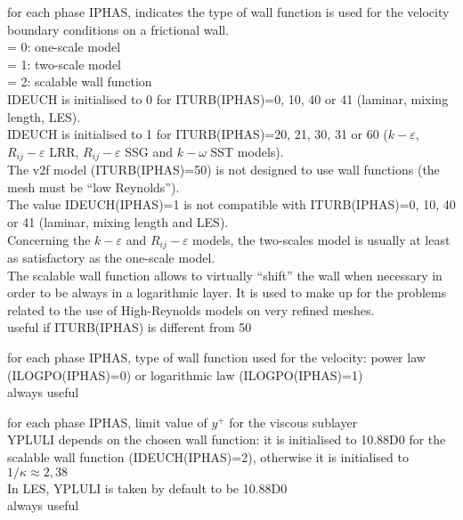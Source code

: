{for each phase IPHAS, indicates the type of wall function is used for the velocity
boundary conditions on a frictional wall.\\
\hspace*{1.3cm}= 0: one-scale model\\
\hspace*{1.3cm}= 1: two-scale model\\
\hspace*{1.3cm}= 2: scalable wall function\\
IDEUCH is initialised to 0 for ITURB(IPHAS)=0, 10, 40 or 41 (laminar,
mixing length, LES).\\
IDEUCH is initialised to 1 for ITURB(IPHAS)=20, 21, 30, 31 or 60
($k-\varepsilon$, $R_{ij}-\varepsilon$ LRR, $R_{ij}-\varepsilon$ SSG and
$k-\omega$ SST models).\\
The v2f model (ITURB(IPHAS)=50) is not designed to use wall functions
(the mesh must be ``low Reynolds'').\\
The value IDEUCH(IPHAS)=1 is not compatible with ITURB(IPHAS)=0, 10, 40
or 41 (laminar, mixing length and LES).\\
Concerning the $k-\varepsilon$ and $R_{ij}-\varepsilon$ models, the
two-scales model is usually at least as satisfactory as the one-scale
model.\\
The scalable wall function allows to virtually ``shift'' the wall when
necessary in order to be always in a logarithmic layer.
It is used to make up for
the problems related to the use of High-Reynolds models on very refined
meshes.\\
useful if ITURB(IPHAS) is different from 50}

{for each phase IPHAS, type of wall function used for the velocity: power law
(ILOGPO(IPHAS)=0) or logarithmic law (ILOGPO(IPHAS)=1)\\
always useful}

{for each phase IPHAS, limit value of $y^+$ for the viscous sublayer\\
YPLULI depends on the chosen wall function: it is
initialised to 10.88D0 for the scalable wall function (IDEUCH(IPHAS)=2),
otherwise it is initialised to $1/\kappa\approx 2,38$\\
In LES, YPLULI is taken by default to be 10.88D0\\
always useful}


